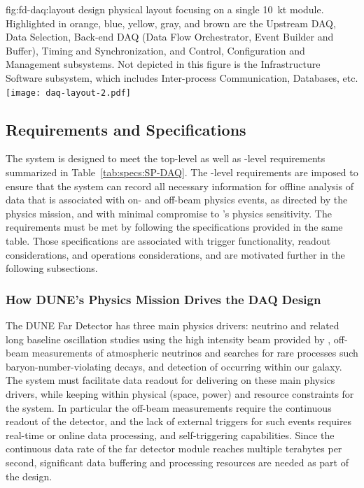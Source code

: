 
\begin{dunefigure}{fig:fd-daq:layout}{ design physical
    layout focusing on a single \SI{10}{\kilo\tonne}
    module. Highlighted in orange, blue, yellow, gray, and brown are
    the Upstream DAQ, Data Selection, Back-end DAQ (Data Flow
    Orchestrator, Event Builder and Buffer), Timing and
    Synchronization, and Control,
    Configuration and Management subsystems. Not depicted in this figure
    is the Infrastructure Software subsystem, which includes Inter-process
    Communication, Databases, etc.
  }
  \texttt{[image: daq-layout-2.pdf]}
\end{dunefigure}


\subsection{Requirements and Specifications}
\label{sec:fd-daq:requirements}

The    system is designed to meet the
 top-level as well as -level requirements
summarized in Table~\ref{tab:specs:SP-DAQ}. The -level requirements are
imposed to ensure that the 
system %
can record all necessary information for offline 
analysis of data that is associated with on- and off-beam physics events, as directed
by the  physics mission, and with minimal compromise to
's physics sensitivity. The requirements must be met by following the 
specifications provided in the same table. Those specifications are
associated with trigger functionality, readout considerations,
and operations considerations, and are motivated further in the following subsections.

\subsubsection{How DUNE's Physics Mission Drives the DAQ Design}

The DUNE Far Detector has three main physics drivers: neutrino  and related
long baseline oscillation studies using the high intensity beam provided
by \fnal, off-beam measurements of atmospheric neutrinos and searches
for rare processes such baryon-number-violating decays,
and detection of  occurring within our galaxy. The
   system must facilitate data
readout for delivering on these main physics drivers, while keeping
within physical (space, power) and resource constraints for
the system. In particular the off-beam measurements require the
continuous readout of the detector, and the lack of external triggers for such
events requires real-time or online data processing, and
self-triggering capabilities. Since the
continuous data rate of the far detector module reaches multiple
terabytes per second, significant data buffering and processing
resources are needed as part of the design.

